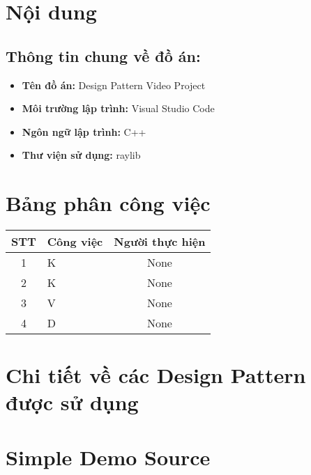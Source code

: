 \documentclass[a4paper,12pt]{report}
\begin{document}
\pagebreak
\section{Nội dung}
\subsection{Thông tin chung về đồ án:}
\begin{itemize}
  \item \textbf{Tên đồ án:} Design Pattern Video Project
  \item \textbf{Môi trường lập trình:} Visual Studio Code
  \item \textbf{Ngôn ngữ lập trình:} C++
  \item \textbf{Thư viện sử dụng:} raylib
\end{itemize}

\section{Bảng phân công việc}
\begin{center}
  \renewcommand{\arraystretch}{1.5}
  \begin{tabular}{|c|p{}|c|}
    \hline
    \textbf{STT} & \textbf{Công việc} & \textbf{Người thực hiện} \\\hline
    1            & K                  & None                     \\\hline
    2            & K                  & None                     \\\hline
    3            & V                  & None                     \\\hline
    4            & D                  & None                     \\\hline
  \end{tabular}
\end{center}

\pagebreak
\section{Chi tiết về các Design Pattern được sử dụng}




\pagebreak
\section{Simple Demo Source}
\end{document}

